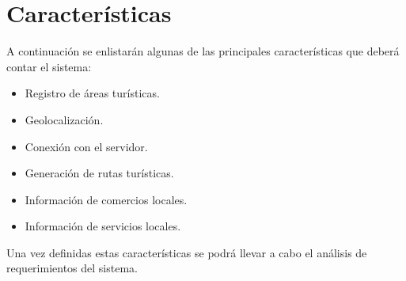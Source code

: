 \section{Características}

A continuación se enlistarán algunas de las principales características que deberá contar el sistema:

\begin{itemize}
	\item Registro de áreas turísticas.
	
	\item Geolocalización.
	
	\item Conexión con el servidor.
	
	\item Generación de rutas turísticas.
	
	\item Información de comercios locales.
	
	\item Información de servicios locales.	
\end{itemize}

Una vez definidas estas características se podrá llevar a cabo el análisis de requerimientos del sistema.